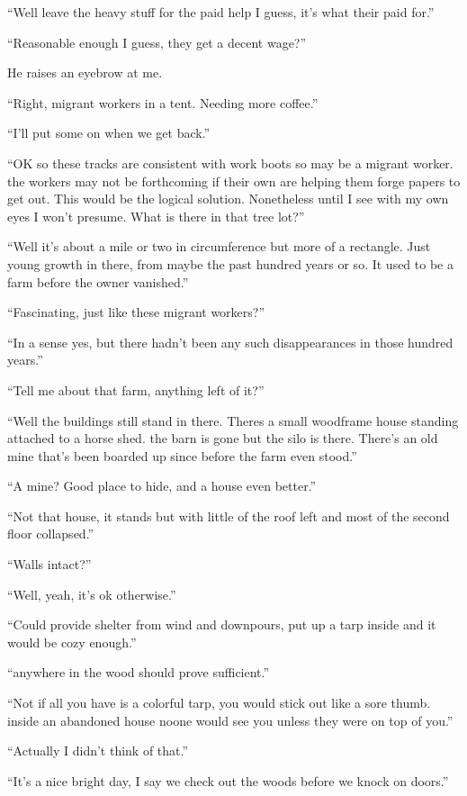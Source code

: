 ``Well leave the heavy stuff for the paid help I guess, it's what their paid for.''

``Reasonable enough I guess, they get a decent wage?''

He raises an eyebrow at me.

``Right, migrant workers in a tent. Needing more coffee.''

``I'll put some on when we get back.''

``OK so these tracks are consistent with work boots so may be a migrant worker. the workers may not be forthcoming if their own are helping them forge papers to get out. This would be the logical solution. Nonetheless until I see with my own eyes I won't presume. What is there in that tree lot?''

``Well it's about a mile or two in circumference but more of a rectangle. Just young growth in there, from maybe the past hundred years or so. It used to be a farm before the owner vanished.''

``Fascinating, just like these migrant workers?''

``In a sense yes, but there hadn't been any such disappearances in those hundred years.''

``Tell me about that farm, anything left of it?''

``Well the buildings still stand in there. Theres a small woodframe house standing attached to a horse shed. the barn is gone but the silo is there. There's an old mine that's been boarded up since before the farm even stood.''

``A mine? Good place to hide, and a house even better.''

``Not that house, it stands but with little of the roof left and most of the second floor collapsed.''

``Walls intact?''

``Well, yeah, it's ok otherwise.''

``Could provide shelter from wind and downpours, put up a tarp inside and it would be cozy enough.''

``anywhere in the wood should prove sufficient.''

``Not if all you have is a colorful tarp, you would stick out like a sore thumb. inside an abandoned house noone would see you unless they were on top of you.''

``Actually I didn't think of that.''

``It's a nice bright day, I say we check out the woods before we knock on doors.''


